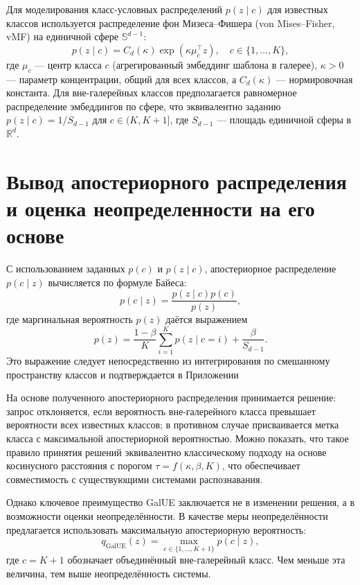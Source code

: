 Для моделирования класс-условных распределений \(p(z \mid c)\) для известных классов используется распределение фон Мизеса–Фишера (von Mises–Fisher, vMF) на единичной сфере \(\mathbb{S}^{d-1}\):  
\[
p(z \mid c) = C_d(\kappa) \exp\left(\kappa \mu_c^\top z\right), \quad c \in \{1, \dots, K\},
\]  
где \(\mu_c\) — центр класса \(c\) (агрегированный эмбеддинг шаблона в галерее), \(\kappa > 0\) — параметр концентрации, общий для всех классов, а \(C_d(\kappa)\) — нормировочная константа.  
Для вне-галерейных классов предполагается равномерное распределение эмбеддингов по сфере, что эквивалентно заданию \(p(z \mid c) = 1 / S_{d-1}\) для \(c \in (K, K+1]\), где \(S_{d-1}\) — площадь единичной сферы в \(\mathbb{R}^d\).  

\section{Вывод апостериорного распределения и оценка неопределенности на его основе}\label{sec:galue/posterior_and_decision}
С использованием заданных \(p(c)\) и \(p(z \mid c)\), апостериорное распределение \(p(c \mid z)\) вычисляется по формуле Байеса:  
\[
p(c \mid z) = \frac{p(z \mid c) p(c)}{p(z)},
\]  
где маргинальная вероятность \(p(z)\) даётся выражением  
\[
p(z) = \frac{1 - \beta}{K} \sum_{i=1}^{K} p(z \mid c=i) + \frac{\beta}{S_{d-1}}.
\]  
Это выражение следует непосредственно из интегрирования по смешанному пространству классов и подтверждается в Приложении  

На основе полученного апостериорного распределения принимается решение: запрос отклоняется, если вероятность вне-галерейного класса превышает вероятности всех известных классов; в противном случае присваивается метка класса с максимальной апостериорной вероятностью.  
Можно показать, что такое правило принятия решений эквивалентно классическому подходу на основе косинусного расстояния с порогом \(\tau = f(\kappa, \beta, K)\), что обеспечивает совместимость с существующими системами распознавания.  

Однако ключевое преимущество GalUE заключается не в изменении решения, а в возможности оценки неопределённости.  
В качестве меры неопределённости предлагается использовать максимальную апостериорную вероятность:  
\[
q_{\text{GalUE}}(z) = \max_{c \in \{1,\dots,K+1\}} p(c \mid z),
\]  
где \(c=K+1\) обозначает объединённый вне-галерейный класс. Чем меньше эта величина, тем выше неопределённость системы.  

